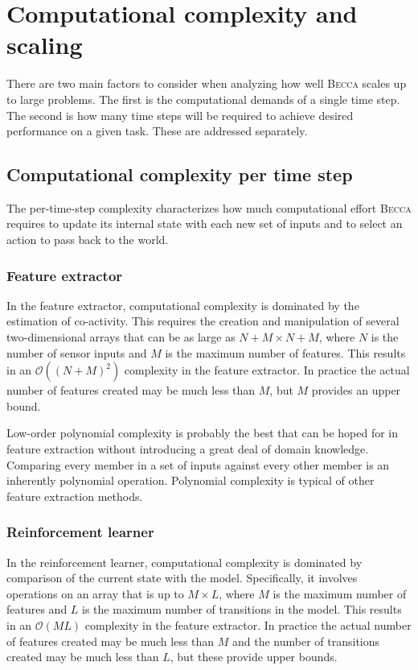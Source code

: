 \chapter{Computational complexity and scaling}

There are two main factors to consider when analyzing how well \textsc{Becca} scales up to large problems. The first is the computational demands of a single time step. The second is how many time steps will be required to achieve desired performance on a given task. These are addressed separately.

\section{Computational complexity per time step}

The per-time-step complexity characterizes how much computational effort  \textsc{Becca} requires to update its internal state with each new set of inputs and to select an action to pass back to the world. 

\subsection{Feature extractor}
In the feature extractor, computational complexity is dominated by the estimation of co-activity.  This requires the creation and manipulation of several two-dimensional arrays that can be as large as $N + M \times N + M$, where $N$ is the number of sensor inputs and $M$ is the maximum number of features. This results in an $\mathcal{O}((N+M)^2)$ complexity in the feature extractor. In practice the actual number of features created may be much less than $M$, but $M$ provides an upper bound.

Low-order polynomial complexity is probably the best that can be hoped for in feature extraction without introducing a great deal of domain knowledge. Comparing every member in a set of inputs against every other member is an inherently polynomial operation. Polynomial complexity is typical of other feature extraction methods. 

\subsection{Reinforcement learner}
In the reinforcement learner, computational complexity is dominated by comparison of the current state with the model. Specifically, it involves operations on an array that is up to $M \times L$, where $M$ is the maximum number of features and $L$ is the maximum number of transitions in the model. This results in an $\mathcal{O}(ML)$ complexity in the feature extractor. In practice the actual number of features created may be much less than $M$ and the number of transitions created may be much less than $L$, but these provide upper bounds.

